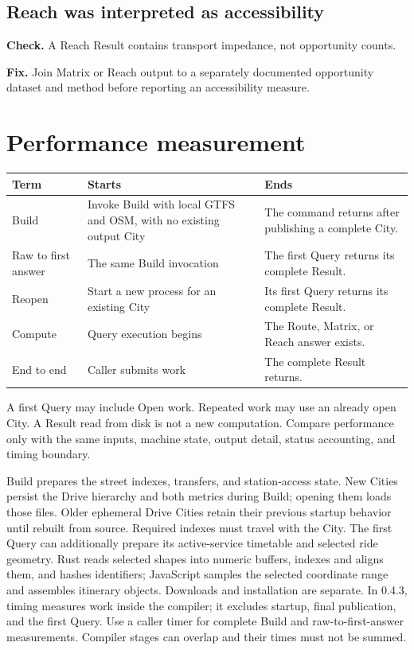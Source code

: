 \documentclass[10pt,letterpaper]{article}
\begin{document}
\subsection{Reach was interpreted as accessibility}

\textbf{Check.} A Reach Result contains transport impedance, not opportunity counts.

\textbf{Fix.} Join Matrix or Reach output to a separately documented opportunity dataset and method before reporting an accessibility measure.

\clearpage
\appendix

\section{Performance measurement}

\begin{center}
\begin{tabularx}{\linewidth}{P{1.05in} Y Y}
\toprule
\textbf{Term} & \textbf{Starts} & \textbf{Ends} \\
\midrule
Build & Invoke Build with local GTFS and OSM, with no existing output City & The command returns after publishing a complete City. \\
Raw to first answer & The same Build invocation & The first Query returns its complete Result. \\
Reopen & Start a new process for an existing City & Its first Query returns its complete Result. \\
Compute & Query execution begins & The Route, Matrix, or Reach answer exists. \\
End to end & Caller submits work & The complete Result returns. \\
\bottomrule
\end{tabularx}
\end{center}

A first Query may include Open work. Repeated work may use an already open City. A Result read from disk is not a new computation. Compare performance only with the same inputs, machine state, output detail, status accounting, and timing boundary.

Build prepares the street indexes, transfers, and station-access state. New Cities persist the Drive hierarchy and both metrics during Build; opening them loads those files. Older ephemeral Drive Cities retain their previous startup behavior until rebuilt from source. Required indexes must travel with the City. The first Query can additionally prepare its active-service timetable and selected ride geometry. Rust reads selected shapes into numeric buffers, indexes and aligns them, and hashes identifiers; JavaScript samples the selected coordinate range and assembles itinerary objects. Downloads and installation are separate. In 0.4.3,  timing  measures work inside the compiler; it excludes startup, final publication, and the first Query. Use a caller timer for complete Build and raw-to-first-answer measurements. Compiler stages can overlap and their times must not be summed.
\end{document}
